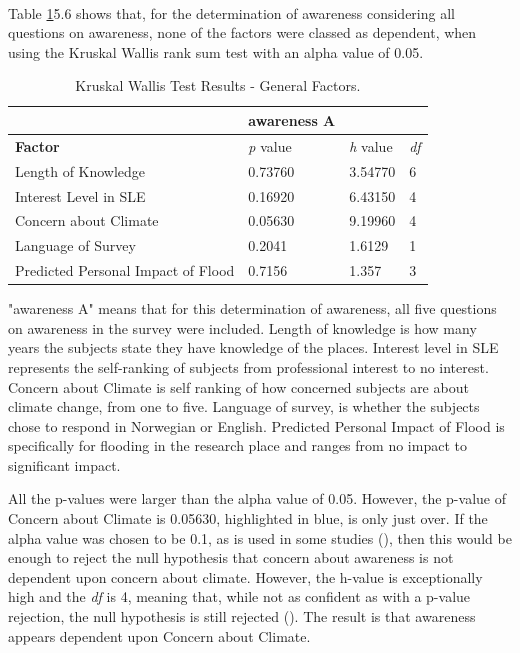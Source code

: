 \paragraph{}

Table \ref{kw_test_general_factors}5.6 shows that, for the determination of awareness considering all questions on awareness, none of the factors were classed as dependent, when using the Kruskal Wallis rank sum test with an alpha value of 0.05. 

\begin{table}[H]
    \centering
    \begin{tabular}{|l|l|l|l|}
    \hline
         ~ & \textbf{awareness A} & ~ & ~ \\ \hline
        \textbf{Factor} &\textit{p} value &\textit{h} value & \textit{df} \\ \hline
           Length of Knowledge & 0.73760 & 3.54770 & 6 \\ \hline
       Interest Level in SLE & 0.16920 & 6.43150 & 4 \\ \hline
        Concern about Climate & \cellcolor[HTML]{7df9ff} 0.05630 & \cellcolor[HTML]{7df9ff} 9.19960 & \cellcolor[HTML]{7df9ff} 4 \\ \hline
        Language of Survey & 0.2041 & 1.6129 & 1 \\ \hline
        Predicted Personal Impact of Flood & 0.7156 & 1.357 & 3 \\ \hline
    \end{tabular}
    \caption{Kruskal Wallis Test Results - General Factors.}{ "awareness A" means that for this determination of awareness, all five questions on awareness in the survey were included. Length of knowledge is how many years the subjects state they have knowledge of the places. Interest level in SLE represents the self-ranking of subjects from professional interest to no interest. Concern about Climate is self ranking of how concerned subjects are about climate change, from one to five. Language of survey, is whether the subjects chose to respond in Norwegian or English. Predicted Personal Impact of Flood is specifically for flooding in the research place and ranges from no impact to significant impact. }
    \label{kw_test_general_factors}
\end{table}

All the p-values were larger than the alpha value of 0.05. However, the p-value of Concern about Climate is 0.05630, highlighted in blue, is only just over.  If the alpha value was chosen to be 0.1, as is used in some studies (\cite{hollander_nonparametric_2014}), then this would be enough to reject the null hypothesis that concern about awareness is not dependent upon concern about climate. However, the h-value is exceptionally high and the \textit{df} is 4, meaning that, while not as confident as with a p-value rejection, the null hypothesis is still rejected (\cite{minitab_interpret_2022}). The result is that awareness appears dependent upon Concern about Climate. 
